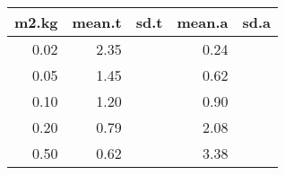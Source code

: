 \begin{table}[ht]
\centering
\begin{tabular}{rrrrr}
  \hline
m2.kg & mean.t & sd.t & mean.a & sd.a \\ 
  \hline
0.02 & 2.35 &  & 0.24 &  \\ 
  0.05 & 1.45 &  & 0.62 &  \\ 
  0.10 & 1.20 &  & 0.90 &  \\ 
  0.20 & 0.79 &  & 2.08 &  \\ 
  0.50 & 0.62 &  & 3.38 &  \\ 
   \hline
\end{tabular}
\end{table}
